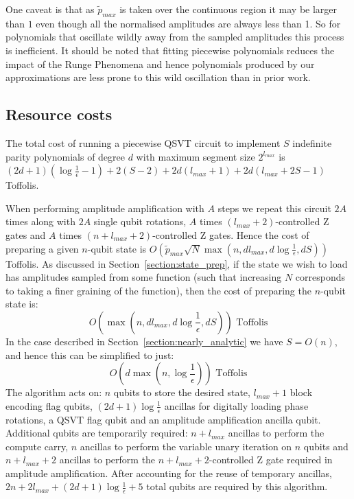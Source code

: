 \documentclass[aps,prx,twocolumn,floatfix,10pt,amssymb,amsfont,amsmath,superscriptaddress,float,nofootinbib,longbibliography,nobalancelastpage]{revtex4-2}
\theoremstyle{empty}
\begin{document}
One caveat is that as $\tilde{p}_{max}$ is taken over the continuous region it may be larger than $1$ even though all the normalised amplitudes are always less than 1. So for polynomials that oscillate wildly away from the sampled amplitudes this process is inefficient. It should be noted that fitting piecewise polynomials reduces the impact of the Runge Phenomena and hence polynomials produced by our approximations are less prone to this wild oscillation than in prior work. 

\subsection{Resource costs}
\label{section:resource}
The total cost of running a piecewise QSVT circuit to implement $S$ indefinite parity polynomials of degree $d$ with maximum segment size $2^{l_{max}}$ is $(2d+1)(\log\frac{1}{\epsilon}-1) + 2(S-2) + 2d(l_{max}+1) + 2d(l_{max} + 2S -1)$ Toffolis. 

When performing amplitude amplification with $A$ steps we repeat this circuit $2A$ times along with $2A$ single qubit rotations, $A$ times $(l_{max}+2)$-controlled Z gates and $A$ times $(n+l_{max}+2)$-controlled Z gates. Hence the cost of preparing a given $n$-qubit state is $O\left(\tilde{p}_{max}\sqrt{N}\max(n,dl_{max},d\log \frac{1}{\epsilon}, dS)\right)$ Toffolis. As discussed in Section~\ref{section:state_prep}, if the state we wish to load has amplitudes sampled from some function (such that increasing $N$ corresponds to taking a finer graining of the function), then the cost of preparing the $n$-qubit state is:
\begin{equation}
    O\left(\max\left(n,dl_{max},d\log \frac{1}{\epsilon}, dS\right)\right) \text{ Toffolis}
\end{equation}
In the case described in Section~\ref{section:nearly_analytic} we have $S = O(n)$, and hence this can be simplified to just:
\begin{equation}
    O\left(d\max\left(n, \log \frac{1}{\epsilon}\right)\right)  \text{ Toffolis}
\end{equation}
The algorithm acts on: $n$ qubits to store the desired state, $l_{max} + 1$ block encoding flag qubits, $(2d+1)\log\frac{1}{\epsilon}$ ancillas for digitally loading phase rotations, a QSVT flag qubit and an amplitude amplification ancilla qubit. Additional qubits are temporarily required: $n + l_{max}$ ancillas to perform the compute carry, $n$ ancillas to perform the variable unary iteration on $n$ qubits and $n+l_{max}+2$ ancillas to perform the $n+l_{max} +2$-controlled Z gate required in amplitude amplification. After accounting for the reuse of temporary ancillas, $2n + 2l_{max} + (2d+1)\log\frac{1}{\epsilon} + 5$ total qubits are required by this algorithm.
\end{document}

